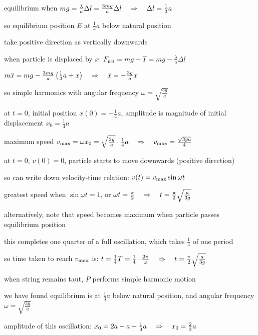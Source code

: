equilibrium when $mg=\frac{\lambda}{a}\Delta l =\frac{3mg}{a}\Delta l \quad \Rightarrow \quad \Delta l = \frac{1}{3}a$

so equilibrium position $E$ at $\frac{1}{3}a$ below natural position

take positive direction as vertically downwards

when particle is displaced by $x$: $F_\text{net}=mg-T = mg - \frac{\lambda}{a}\Delta l$

{
\centering

$m\ddot{x} = mg - \frac{3mg}{a} \left(\frac{1}{3}a+x\right) \quad \Rightarrow \quad \ddot{x} = - \frac{3g}{a}x$

}

so simple harmonics with angular frequency $\omega =\sqrt{ \frac{3g}{a}}$

at $t=0$, initial position $x(0)=-\frac{1}{4}a$, amplitude is magnitude of initial displacement $x_0 = \frac{1}{4}a$

maximum speed $v_{\text{max}} = \omega x_0 = \sqrt{ \frac{3g}{a}} \cdot \frac{1}{4}a \quad \Rightarrow \quad v_{\text{max}} = \frac{\sqrt{3ga}}{4}$

at $t=0$, $v(0)=0$, particle starts to move downwards (positive direction)

so can write down velocity-time relation: $v(t) = v_{\text{max}} \sin \omega t$

greatest speed when $\sin\omega t=1$, or $\omega t = \frac{\pi}{2} \quad \Rightarrow \quad t= \frac{\pi}{2}\sqrt{\frac{a}{3g}}$ 

alternatively, note that speed becomes maximum when particle passes equilibrium position

this completes one quarter of a full oscillation, which takes $\frac{1}{4}$ of one period

so time taken to reach $v_{\text{max}}$ is: $t=\frac{1}{4}T = \frac{1}{4}\cdot\frac{2\pi}{\omega} \quad \Rightarrow \quad  t=\frac{\pi}{2}\sqrt{\frac{a}{3g}}$  \eoe


when string remains taut, $P$ performs simple harmonic motion

we have found equilibrium is at $\frac{1}{3}a$ below natural position, and angular frequency $\omega=\sqrt{\frac{3g}{a}}$

amplitude of this oscillation: $x_0 = 2a - a -\frac{1}{3}a \quad \Rightarrow \quad x_0 = \frac{2}{3}a$


